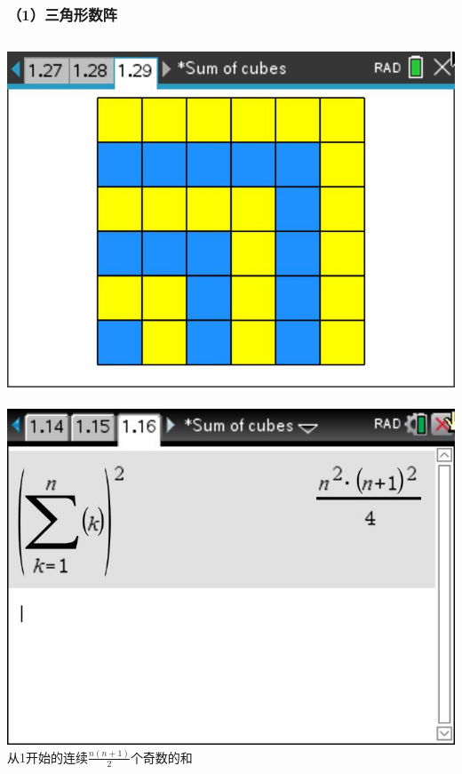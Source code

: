 \documentclass[aspectratio=169]{beamer}
\begin{document}
       \begin{frame}
     \frametitle{（1）三角形数阵}
     \begin{columns}
     	\includegraphics[scale=0.255]{奇数和拼图.jpg}\\
         \footnotesize {}\\
        \vspace{2cm}
     	\includegraphics[scale=0.3]{奇数和计算.jpg}
     	 \footnotesize 从1开始的连续$ \frac{n\left( n+1\right) }{2} $个奇数的和\\
     	\vspace{2cm}
     \end{columns}      
 \end{frame}
\end{document}
